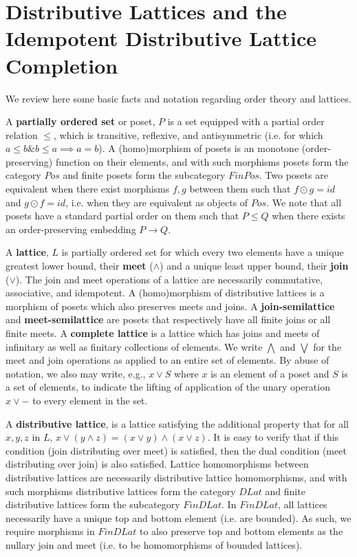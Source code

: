 \documentclass[hoptionsi,review,format=acmsmall]{acmart}
\theoremstyle{definition}
\newcommand{\band}{\mathbin{\&}}
\begin{document}

\section{Distributive Lattices and the Idempotent Distributive Lattice Completion}

We review here some basic facts and notation regarding order theory and lattices.

A \textbf{partially ordered set} or poset, \(P\) is a set equipped with a partial order relation \(\le\), which is transitive,  reflexive, and antisymmetric (i.e. for which \( a \le b \band b \le a \implies a = b\)). A (homo)morphism of posets is an monotone (order-preserving) function on their elements, and with such morphisms posets form the category \(Pos\) and finite posets form the subcategory \(FinPos\). Two posets are equivalent when there exist morphisms \(f, g\) between them such that \(f \odot g = id\) and \(g \odot f = id\), i.e. when they are equivalent as objects of \(Pos\). We note that all posets have a standard partial order on them such that \(P \le Q\) when there exists an order-preserving embedding \(P \rightarrow Q\).

A \textbf{lattice}, \(L\) is partially ordered set for which every two elements have a unique greatest lower bound, their \textbf{meet} (\(\wedge\)) and a unique least upper bound, their \textbf{join} (\(\vee\)). The join and meet operations of a lattice are necessarily commutative, associative, and idempotent. A (homo)morphism of distributive lattices is a morphism of posets which also preserves meets and joins. A \textbf{join-semilattice} and \textbf{meet-semilattice} are posets that respectively have all finite joins or all finite meets. A \textbf{complete lattice} is a lattice which has joins and meets of infinitary as well as finitary collections of elements. We write \(\bigwedge\) and \(\bigvee\) for the meet and join operations as applied to an entire set of elements. By abuse of notation, we also may write, e.g., \(x \vee S\) where \(x\) is an element of a poset and \(S\) is a set of elements, to indicate the lifting of application of the unary operation \(x \vee -\) to every element in the set.

A \textbf{distributive lattice}, is a lattice satisfying the additional property that for all \(x, y, z\) in \(L\), \(x \vee (y \wedge z) = (x \vee y) \wedge (x \vee z)\). It is easy to verify that if this condition (join distributing over meet) is satisfied, then the dual condition (meet distributing over join) is also satisfied.  Lattice homomorphisms between distributive lattices are necessarily distributive lattice homomorphisms, and with such morphisms distributive lattices form the category \(DLat\) and finite distributive lattices form the subcategory \(FinDLat\). In \(FinDLat\), all lattices necessarily have a unique top and bottom element (i.e. are bounded). As such, we require morphisms in \(FinDLat\) to also preserve top and bottom elements as the nullary join and meet (i.e. to be homomorphisms of bounded lattices).
\end{document}
